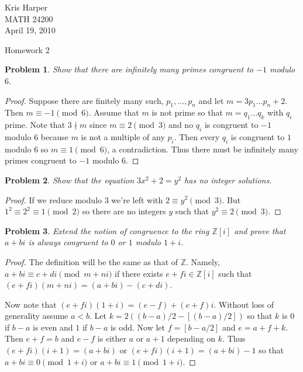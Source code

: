\documentclass{article}
\newtheorem{problem}{Problem}
\begin{document}
\begin{flushright}
Kris Harper\\

MATH 24200\\

April 19, 2010
\end{flushright}

\begin{center}
Homework 2
\end{center}

\begin{problem}
Show that there are infinitely many primes congruent to $-1$ modulo $6$.
\end{problem}
\begin{proof}
Suppose there are finitely many such, $p_1, \dots , p_n$ and let $m = 3p_1 \dots p_n + 2$. Then $m \equiv -1 \pmod {6}$. Assume that $m$ is not prime so that $m = q_1 \dots q_k$ with $q_i$ prime. Note that $3 \nmid m$ since $m \equiv 2 \pmod{3}$ and no $q_i$ is congruent to $-1$ modulo $6$ because $m$ is not a multiple of any $p_i$. Then every $q_i$ is congruent to $1$ modulo $6$ so $m \equiv 1 \pmod{6}$, a contradiction. Thus there must be infinitely many primes congruent to $-1$ modulo $6$.
\end{proof}

\begin{problem}
Show that the equation $3x^2 + 2 = y^2$ has no integer solutions.
\end{problem}
\begin{proof}
If we reduce modulo $3$ we're left with $2 \equiv y^2 \pmod{3}$. But $1^2 \equiv 2^2 \equiv 1 \pmod{2}$ so there are no integers $y$ such that $y^2 \equiv 2 \pmod{3}$.
\end{proof}

\begin{problem}
\label{icong}
Extend the notion of congruence to the ring $\mathbb{Z}[i]$ and prove that $a + bi$ is always congruent to $0$ or $1$ modulo $1 + i$.
\end{problem}
\begin{proof}
The definition will be the same as that of $\mathbb{Z}$. Namely, $a + bi \equiv c + di \pmod{m+ni}$ if there exists $e + fi \in \mathbb{Z}[i]$ such that $(e+fi)(m+ni) = (a + bi) - (c + di)$.

Now note that $(e + fi)(1 + i) = (e-f) + (e + f)i$. Without loss of generality assume $a < b$. Let $k = 2((b-a)/2 - [(b-a)/2])$ so that $k$ is $0$ if $b-a$ is even and $1$ if $b-a$ is odd. Now let $f = [b-a/2]$ and $e = a + f + k$. Then $e + f = b$ and $e - f$ is either $a$ or $a + 1$ depending on $k$. Thus $(e + fi)(i+1) = (a + bi)$ or $(e + fi)(i+1) = (a + bi) - 1$ so that $a + bi \equiv 0 \pmod{1 + i}$ or $a + bi \equiv 1 \pmod{1 + i}$.
\end{proof}
\end{document}
